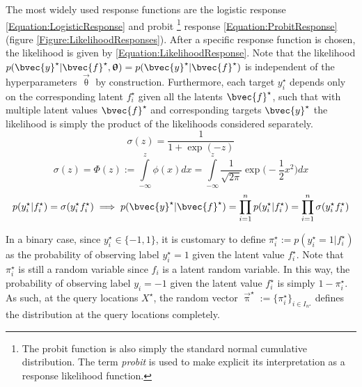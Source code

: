 			The most widely used response functions are the logistic response \eqref{Equation:LogisticResponse} and probit \footnote{The probit function is also simply the standard normal cumulative distribution. The term \textit{probit} is used to make explicit its interpretation as a response likelihood function.} response \eqref{Equation:ProbitResponse} (figure \ref{Figure:LikelihoodResponses}). After a specific response function is chosen, the likelihood is given by \eqref{Equation:LikelihoodResponse}. Note that the likelihood $p(\bvec{y}^{\star} | \bvec{f}^{\star}, \vec{\uptheta}) = p(\bvec{y}^{\star} | \bvec{f}^{\star})$ is independent of the hyperparameters $\vec{\uptheta}$ by construction. Furthermore, each target $y^{\star}_{i}$ depends only on the corresponding latent $f^{\star}_{i}$ given all the latents $\bvec{f}^{\star}$, such that with multiple latent values $\bvec{f}^{\star}$ and corresponding targets $\bvec{y}^{\star}$ the likelihood is simply the product of the likelihoods considered separately. \begin{equation}
				\sigma(z) = \frac{1}{1 + \exp(-z)}
			\label{Equation:LogisticResponse}
			\end{equation} \begin{equation}
				\sigma(z) = \Phi(z) := \int\limits_{-\infty}^{z} \phi(x) dx =  \int\limits_{-\infty}^{z} \frac{1}{\sqrt{2 \pi}} \exp\Big(- \frac{1}{2} x^{2}\Big) dx
			\label{Equation:ProbitResponse}
			\end{equation} \begin{equation}
				p(y^{\star}_{i} | f^{\star}_{i}) = \sigma(y^{\star}_{i} f^{\star}_{i}) \implies p(\bvec{y}^{\star} | \bvec{f}^{\star}) = \prod_{i = 1}^{n} p(y^{\star}_{i} | f^{\star}_{i}) = \prod_{i = 1}^{n} \sigma(y^{\star}_{i} f^{\star}_{i})
			\label{Equation:LikelihoodResponse}
			\end{equation}				
			
			In a binary case, since $y^{\star}_{i} \in \{-1, 1\}$, it is customary to define $\pi^{\star}_{i} := p(y^{\star}_{i} = 1 | f^{\star}_{i})$ as the probability of observing label $y^{\star}_{i} = 1$ given the latent value $f^{\star}_{i}$. Note that $\pi^{\star}_{i}$ is still a random variable since $f_{i}$ is a latent random variable. In this way, the probability of observing label $y_{i} = -1$ given the latent value $f^{\star}_{i}$ is simply $1 - \pi^{\star}_{i}$. As such, at the query locations $X^{\star}$, the random vector $\vec{\uppi}^{\star} := \{\pi^{\star}_{i}\}_{i \in I_{n^{\star}}}$ defines the distribution at the query locations completely.
			
